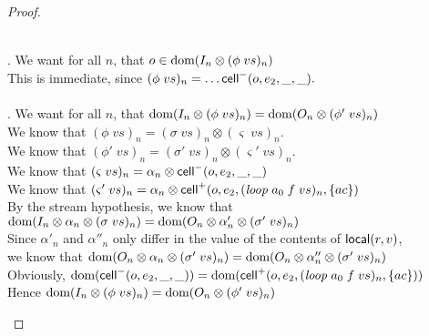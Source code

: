 \begin{proof}
\begin{enumerate}
\begin{tabbedproof}
  \\ . We want for all $n$, that $o \in \mbox{dom}({I_n \otimes (\phi\;vs)_n})$ \\
  \ooo This is immediate, since $(\phi\;vs)_n = \ldots \mathsf{cell}^{-}({o}, {e_2}, {\_}, {\_}).$ \\ 

  \\ . We want for all $n$, that $\mbox{dom}({I_n \otimes (\phi\;vs)_n}) = \mbox{dom}({O_n \otimes (\phi'\;vs)_n})$ \\
  \ooo We know that $(\phi\;vs)_n = (\sigma\;vs)_n \otimes (\varsigma\;vs)_n$. \\
  \ooo We know that $(\phi'\;vs)_n = (\sigma'\;vs)_n \otimes (\varsigma'\;vs)_n$. \\
  \ooo We know that $(\varsigma\;vs)_n = \alpha_n \otimes \mathsf{cell}^{-}({o}, {e_2}, {\_}, {\_})$ \\
  \ooo We know that $(\varsigma'\;vs)_n = \alpha_n \otimes \mathsf{cell}^{+}({o}, {e_2}, {(\mathit{loop}\;a_0\;f\;vs)_n}, {\{{ac}\}})$ \\
  \ooo By the stream hypothesis, we know that \\
  \ooox $\mbox{dom}({I_n \otimes \alpha_n \otimes (\sigma\;vs)_n}) = 
       \mbox{dom}({O_n \otimes \alpha'_n \otimes (\sigma'\;vs)_n})$ \\
  \ooo Since $\alpha'_n$ and $\alpha''_n$ only differ in the value of the contents of $\mathsf{local}({r}, {v})$, \\
  \ooo we know that $\mbox{dom}({O_n \otimes \alpha_n \otimes (\sigma'\;vs)_n}) = \mbox{dom}({O_n \otimes \alpha''_n \otimes (\sigma'\;vs)_n})$ \\
  \ooo Obviously, $\mbox{dom}({\mathsf{cell}^{-}({o}, {e_2}, {\_}, {\_})}) = \mbox{dom}({\mathsf{cell}^{+}({o}, {e_2}, {(\mathit{loop}\;a_0\;f\;vs)_n}, {\{{ac}\}})})$ \\
  \ooo Hence $\mbox{dom}({I_n \otimes (\phi\;vs)_n}) = \mbox{dom}({O_n \otimes (\phi'\;vs)_n})$ \\


\end{tabbedproof}
\end{enumerate}
\end{proof}
